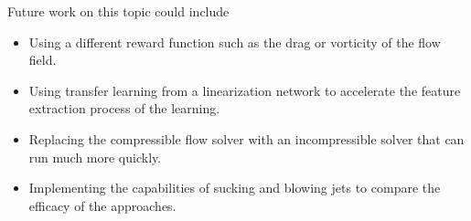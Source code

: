 \documentclass{article}
\begin{document}
Future work on this topic could include
\begin{itemize}
    \item Using a different reward function such as the drag or vorticity of the flow field.
    \item Using transfer learning from a linearization network \cite{morton2018deep} to accelerate the feature extraction process of the learning. 
    \item Replacing the compressible flow solver with an incompressible solver that can run much more quickly.
    \item Implementing the capabilities of sucking and blowing jets to compare the efficacy of the approaches.
\end{itemize}






\end{document}
